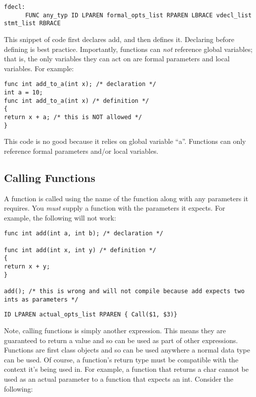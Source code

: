\documentclass{article}
\begin{document}
\begin{Verbatim}[frame=single]
fdecl:
	  FUNC any_typ ID LPAREN formal_opts_list RPAREN LBRACE vdecl_list stmt_list RBRACE
\end{Verbatim}

This snippet of code first declares add, and then defines it. Declaring before defining is best practice. Importantly, functions can \emph{not} reference global variables; that is, the only variables they can act on are formal parameters and local variables. For example:

\begin{lstlisting}
func int add_to_a(int x); /* declaration */
int a = 10;
func int add_to_a(int x) /* definition */
{
return x + a; /* this is NOT allowed */
}
\end{lstlisting}

This code is no good because it relies on global variable ``a''. Functions can only reference formal parameters and/or local variables.

\subsection{Calling Functions}

A function is called using the name of the function along with any parameters it requires. You \emph{must} supply a function with the parameters it expects. For example, the following will not work:

\begin{lstlisting}
func int add(int a, int b); /* declaration */

func int add(int x, int y) /* definition */
{
return x + y;
}

add(); /* this is wrong and will not compile because add expects two ints as parameters */

\end{lstlisting}

\begin{Verbatim}[frame=single]
	 ID LPAREN actual_opts_list RPAREN { Call($1, $3)}
\end{Verbatim}

Note, calling functions is simply another expression. This means they are guaranteed to return a value and so can be used as part of other expressions.
Functions are first class objects and so can be used anywhere a normal data type can be used. Of course, a function's return type must be compatible with the context it's being used in. For example, a function that returns a char cannot be used as an actual parameter to a function that expects an int.  Consider the following:
\end{document}
